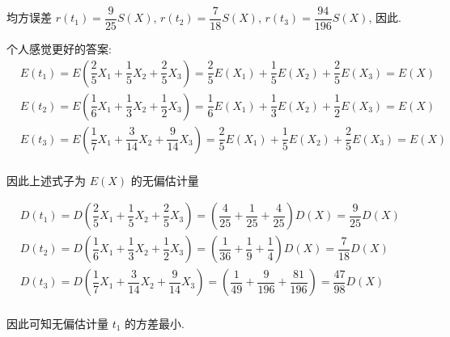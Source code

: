 均方误差 $r(t_1)=\dfrac{9}{25}S(X)$, $r(t_2)=\dfrac{7}{18}S(X)$, $r(t_3)=\dfrac{94}{196}S(X)$, 因此.

\vspace{12pt}

个人感觉更好的答案:\\

$\begin{aligned}
    &E(t_1)=E(\dfrac{2}{5}X_1+\dfrac{1}{5}X_2+\dfrac{2}{5}X_3)=\dfrac{2}{5}E(X_1)+\dfrac{1}{5}E(X_2)+\dfrac{2}{5}E(X_3)=E(X)\\
    &E(t_2)=E(\dfrac{1}{6}X_1+\dfrac{1}{3}X_2+\dfrac{1}{2}X_3)=\dfrac{1}{6}E(X_1)+\dfrac{1}{3}E(X_2)+\dfrac{1}{2}E(X_3)=E(X)\\
    &E(t_3)=E(\dfrac{1}{7}X_1+\dfrac{3}{14}X_2+\dfrac{9}{14}X_3)=\dfrac{2}{5}E(X_1)+\dfrac{1}{5}E(X_2)+\dfrac{2}{5}E(X_3)=E(X)\\
\end{aligned}$

因此上述式子为 $E(X)$ 的无偏估计量

$\begin{aligned}
    &D(t_1)=D(\dfrac{2}{5}X_1+\dfrac{1}{5}X_2+\dfrac{2}{5}X_3)=(\dfrac{4}{25}+\dfrac{1}{25}+\dfrac{4}{25})D(X)=\dfrac{9}{25}D(X)\\
    &D(t_2)=D(\dfrac{1}{6}X_1+\dfrac{1}{3}X_2+\dfrac{1}{2}X_3)=(\dfrac{1}{36}+\dfrac{1}{9}+\dfrac{1}{4})D(X)=\dfrac{7}{18}D(X)\\
    &D(t_3)=D(\dfrac{1}{7}X_1+\dfrac{3}{14}X_2+\dfrac{9}{14}X_3)=(\dfrac{1}{49}+\dfrac{9}{196}+\dfrac{81}{196})=\dfrac{47}{98}D(X)\\
\end{aligned}$

因此可知无偏估计量 $t_1$ 的方差最小.

\vspace{12pt}